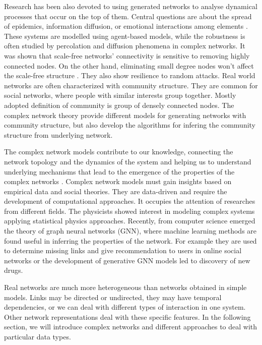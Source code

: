 Research has been also devoted to using generated networks to analyse dynamical processes that occur on the top of them. Central questions are about the spread of epidemics, information diffusion, or emotional interactions among elements \cite{garas2012emotional}. These systems are modelled using agent-based models, while the robustness is often studied by percolation and diffusion phenomena in complex networks. It was shown that scale-free networks' connectivity is sensitive to removing highly connected nodes. On the other hand, eliminating small degree nodes won't affect the scale-free structure \cite{cohen2000resilience}. They also show resilience to random attacks.  Real world networks are often characterized with community structure. They are common for social networks, where people with similar interests group together. Mostly adopted definition of community is group of densely connected nodes. The complex network theory provide different models for generating networks with community structure, but also develop the algorithms for infering the community structure from underlying network. 

The complex network models contribute to our knowledge, connecting the network topology and the dynamics of the system and helping us to understand underlying mechanisms that lead to the emergence of the properties of the complex networks \cite{barabasi1999, tadic2001, mitrovic2009, ghoshal2013uncovering}. %
Complex network models must gain insights based on empirical data and social theories. They are data-driven and require the development of computational approaches. It occupies the attention of researches from different fields. The physicists showed interest in modeling complex systems applying statistical physics approaches. Recently, from computer science emerged the theory of graph neural networks (GNN), where machine learning methods are found useful in inferring the properties of the network. For example they are used to determine missing links and give recommendation to users in online social networks or the development of generative GNN models led to discovery of new drugs.  

Real networks are much more heterogeneous than networks obtained in simple models. Links may be directed or undirected, they may have temporal dependencies, or we can deal with different types of interaction in one system. Other network representations deal with these specific features. In the following section, we will introduce complex networks and different approaches to deal with particular data types. 

